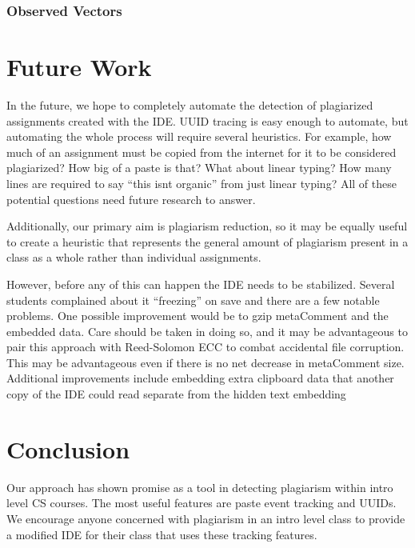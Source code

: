 \documentclass[letterpaper,10pt,conference]{IEEEtran}
\newcommand{\metaComment}{metaComment\xspace}
\begin{document}
\subsubsection{Observed Vectors}

\section{Future Work}
In the future, we hope to completely automate the detection of plagiarized assignments created with the IDE.  UUID tracing is easy enough to automate, but automating the whole process will require several heuristics.  For example, how much of an assignment must be copied from the internet for it to be considered plagiarized?  How big of a paste is that?  What about linear typing?  How many lines are required to say ``this isnt organic'' from just linear typing?  All of these potential questions need future research to answer.  

Additionally, our primary aim is plagiarism reduction, so it may be equally useful to create a heuristic that represents the general amount of plagiarism present in a class as a whole rather than individual assignments. 

However, before any of this can happen the IDE needs to be stabilized.  Several students complained about it ``freezing'' on save and there are a few notable problems.  One possible improvement would be to gzip \metaComment and the embedded data.  Care should be taken in doing so, and it may be advantageous to pair this approach with Reed-Solomon ECC to combat accidental file corruption.  This may be advantageous even if there is no net decrease in \metaComment size.  Additional improvements include embedding extra clipboard data that another copy of the IDE could read separate from the hidden text embedding
\section{Conclusion}
Our approach has shown promise as a tool in detecting plagiarism within intro level CS courses.  The most useful features are paste event tracking and UUIDs.  We encourage anyone concerned with plagiarism in an intro level class to provide a modified IDE for their class that uses these tracking features.









\end{document}

